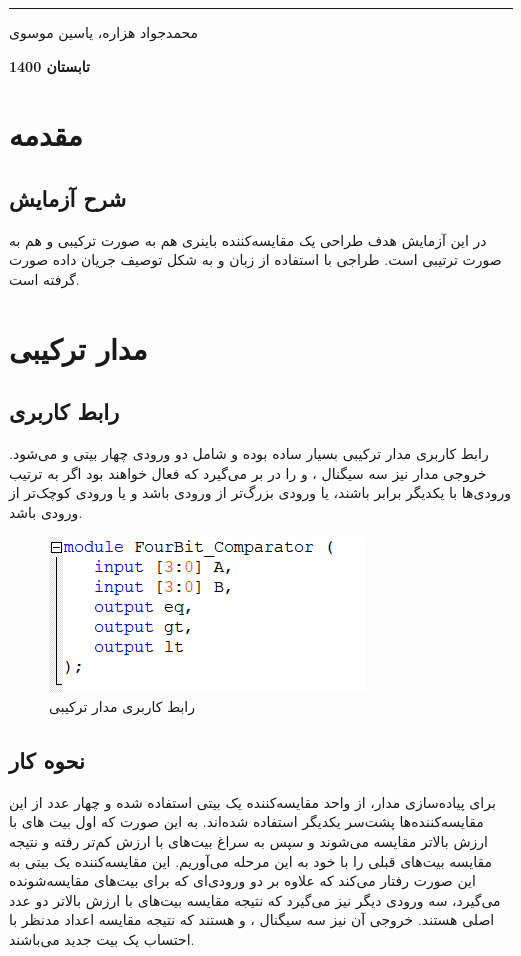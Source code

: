 \documentclass[12pt,onecolumn,a4paper,fleqn]{article}
\begin{document}
\begin{titlepage}
\begin{center}
			\noindent\rule[1ex]{\linewidth}{1pt}
			\vspace*{1.5cm}
			\begin{Large}
				محمدجواد هزاره، یاسین موسوی
				
				\vspace*{1.5cm}
				\textbf{
					تابستان 1400
				}
			\end{Large}			
		\end{center}
		\thispagestyle{empty}
	\end{titlepage}	
	\pagebreak
	
	\tableofcontents
	\thispagestyle{empty}
	\pagebreak
	\section{مقدمه}
	\subsection{شرح آزمایش}
	در این آزمایش هدف طراحی یک مقايسه‌کننده باینری هم به صورت ترکیبی و هم به صورت ترتیبی است. طراجی با استفاده از زبان
	 و به شکل توصیف جریان داده صورت گرفته است.
	\pagebreak
	\section{مدار ترکیبی}
	\subsection{رابط‌ کاربری}
	رابط کاربری مدار ترکیبی بسیار ساده بوده و شامل دو ورودی چهار بیتی
	و
	می‌شود. خروجی مدار نیز سه سیگنال 
	،
	و
	را در بر می‌گیرد که فعال خواهند بود اگر به ترتیب ورودی‌ها با یکدیگر برابر باشند، یا ورودی 
	بزرگ‌تر از ورودی 
	باشد و یا ورودی
	کوچک‌تر از ورودی 
	باشد.
	\begin{figure}[H]
		\centering
		\includegraphics[scale=0.95]{source/interface_comb.png}
		\caption{رابط کاربری مدار ترکیبی}
	\end{figure}
	\subsection{نحوه کار}
	برای پیاده‌سازی مدار، از واحد مقايسه‌کننده یک بیتی استفاده شده و چهار عدد از این مقايسه‌کننده‌ها پشت‌سر یکدیگر استفاده شده‌اند. به این صورت که اول بیت های با ارزش بالاتر مقایسه می‌شوند و سپس به سراغ بیت‌های با ارزش کم‌تر رفته و نتیجه مقایسه بیت‌های قبلی را با خود به این مرحله می‌آوریم. این مقایسه‌کننده یک بیتی به این صورت رفتار می‌کند که علاوه بر دو ورودی‌ای که برای بیت‌های مقایسه‌شونده می‌گیرد، سه ورودی دیگر نیز می‌گیرد که نتیجه مقایسه بیت‌های با ارزش بالاتر دو عدد اصلی هستند. خروجی آن نیز سه سیگنال
	،
	و
	هستند که نتیجه مقایسه اعداد مدنظر با احتساب یک بیت جدید می‌باشند.
\end{document}
